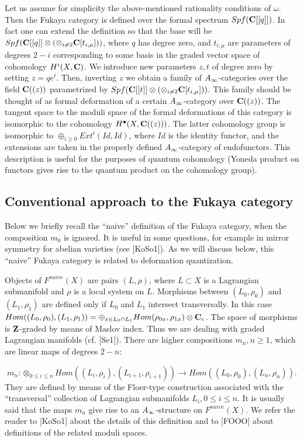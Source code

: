 \documentclass[a4paper,12pt]{article}
\begin{document}
Let us assume for simplicity
the above-mentioned rationality conditions of $\omega$. Then the Fukaya
category is defined over
the formal spectrum $Spf({\bf C}[[q]])$. In fact one can extend the definition
so that the base will be 
$Spf({\bf C}[[q]]\otimes(\otimes_{i\ne 2} {\bf C}[t_{i,\mu}]))$, 
where $q$ has degree zero, and
$t_{i,\mu}$ are parameters of degrees $2-i$ corresponding to some basis 
in the graded vector space of cohomology
$H^{i}(X,{\bf C})$. We introduce new parameters $z,t$ of degree zero
by setting $z=qe^t$.
Then, inverting $z$ we obtain a family of $A_{\infty}$-categories over 
the field ${\bf C}((z))$
parametrized by $Spf({\bf C}[[t]]\otimes (\otimes_{i\ne 2}{\bf C}[t_{i,\mu}]))$. 
This family should be thought of as formal deformation of a certain $A_{\infty}$-category
over ${\bf C}((z))$. The tangent space to the moduli space of the formal
deformations of this category is isomorphic to the cohomology 
$H^{\bullet}(X,{\bf C}((z)))$. 
The latter cohomology group is isomorphic
to $\oplus_{i\ge 0}Ext^i(Id,Id)$, where $Id$ is the identity functor,
and the extensions are taken in the properly
defined $A_{\infty}$-category of endofunctors.
This description is useful for the purposes
of quantum cohomology (Yoneda product on functors gives rise
to the quantum product on the cohomology group).


\subsection{Conventional approach to the Fukaya category}

Below we briefly recall the ``naive'' definition of the Fukaya category,
when the composition $m_0$ is ignored.
It is useful in some questions, for example in mirror
symmetry for abelian varieties (see [KoSo1]). As we will discuss below, this
``naive'' Fukaya category is related to deformation quantization.

Objects of $F^{naive}(X)$ are pairs $(L,\rho)$, where
$L\subset X$ is a Lagrangian submanifold and
$\rho$ is a local system on $L$. Morphisms
between $(L_0,\rho_0)$ and $(L_1,\rho_1)$ are defined
only if $L_0$ and $L_1$ intersect transversally.
In this case $Hom((L_0,\rho_0),(L_1,\rho_1))=
\oplus_{x\in L_0\cap L_1}Hom(\rho_{0x},\rho_{1x})\otimes {{\bf C}_{\epsilon}}$.
The space of morphisms is ${\bf Z}$-graded by means of Maslov index.
Thus we are dealing with graded Lagrangian
manifolds (cf. [Se1]).
There are higher compositions $m_n,n\ge 1$, which are
linear maps of degrees $2-n$:

$$m_n:\otimes_{0\le i\le n}Hom((L_i,\rho_{i}),(L_{i+1},\rho_{i+1}))\to
Hom((L_0,\rho_0),(L_n,\rho_n)).$$
They are defined by means of the Floer-type construction
associated with the ``transversal'' collection of 
Lagrangian submanifolds $L_i,0\le i\le n$. It is usually said that
the maps $m_n$ give rise to an $A_{\infty}$-structure on $F^{naive}(X)$.
We refer the reader to [KoSo1] about the details of this definition
and to [FOOO] about definitions of the related moduli spaces.
\end{document}
